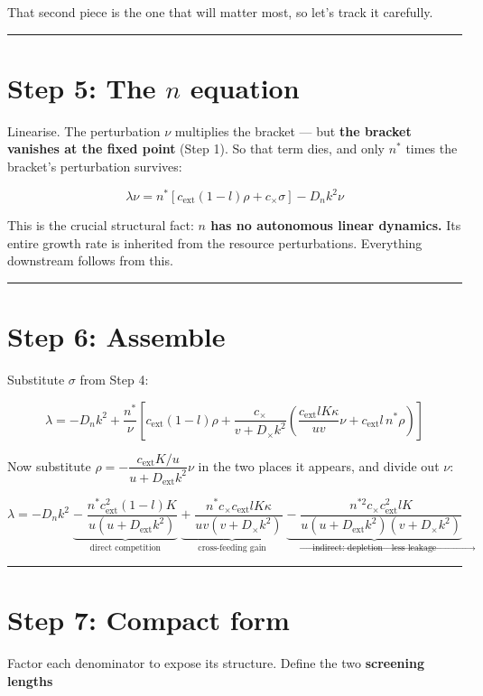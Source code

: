 \documentclass[11pt]{article}
\begin{document}
That second piece is the one that will matter most, so let's track it carefully.

\bigskip\hrule\bigskip

\section*{Step 5: The $n$ equation}

Linearise. The perturbation $\nu$ multiplies the bracket --- but \textbf{the bracket vanishes at the fixed point} (Step 1). So that term dies, and only $n^*$ times the bracket's perturbation survives:

\[
\lambda\nu = n^*\left[c_{\text{ext}}(1-l)\rho + c_\times \sigma\right] - D_n k^2 \nu
\]

This is the crucial structural fact: \textbf{$n$ has no autonomous linear dynamics.} Its entire growth rate is inherited from the resource perturbations. Everything downstream follows from this.

\bigskip\hrule\bigskip

\section*{Step 6: Assemble}

Substitute $\sigma$ from Step 4:

\[
\lambda = -D_nk^2 + \frac{n^*}{\nu}\left[c_{\text{ext}}(1-l)\rho + \frac{c_\times}{v+D_\times k^2}\left(\frac{c_{\text{ext}}lK\kappa}{uv}\nu + c_{\text{ext}}l\,n^*\rho\right)\right]
\]

Now substitute $\rho = -\dfrac{c_{\text{ext}}K/u}{u+D_{\text{ext}}k^2}\nu$ in the two places it appears, and divide out $\nu$:

\[
\lambda = -D_nk^2 \;\underbrace{-\; \frac{n^*c_{\text{ext}}^2(1-l)K}{u\left(u+D_{\text{ext}}k^2\right)}}_{\text{direct competition}} \;\underbrace{+\; \frac{n^*c_\times c_{\text{ext}}lK\kappa}{uv\left(v+D_\times k^2\right)}}_{\text{cross-feeding gain}} \;\underbrace{-\; \frac{n^{*2}c_\times c_{\text{ext}}^2 lK}{u\left(u+D_{\text{ext}}k^2\right)\left(v+D_\times k^2\right)}}_{\text{indirect: depletion} \to \text{less leakage}}
\]

\bigskip\hrule\bigskip

\section*{Step 7: Compact form}

Factor each denominator to expose its structure. Define the two \textbf{screening lengths}
\end{document}
